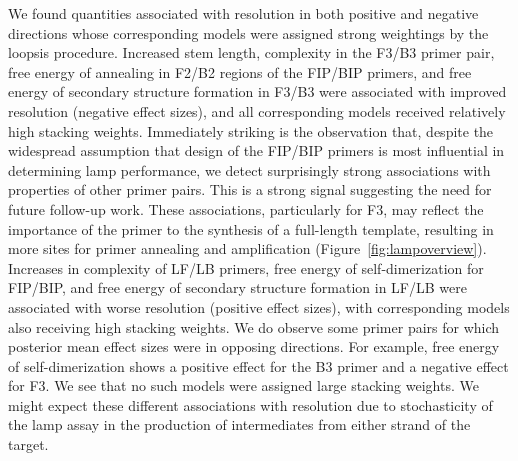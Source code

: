 \documentclass[../thesis.tex]{subfiles}
\begin{document}
We found quantities associated with resolution in both positive and negative directions whose corresponding models were assigned strong weightings by the \gls{loopsis} procedure. Increased stem length, complexity in the F3/B3 primer pair, free energy of annealing in F2/B2 regions of the FIP/BIP primers, and free energy of secondary structure formation in F3/B3 were associated with improved resolution (negative effect sizes), and all corresponding models received relatively high stacking weights.
Immediately striking is the observation that, despite the widespread assumption that design of the FIP/BIP primers is most influential in determining \gls{lamp} performance, we detect surprisingly strong associations with properties of other primer pairs. This is a strong signal suggesting the need for future follow-up work.
These associations, particularly for F3, may reflect the importance of the primer to the synthesis of a full-length template, resulting in more sites for primer annealing and amplification (Figure~\ref{fig:lampoverview}). Increases in complexity of LF/LB primers, free energy of self-dimerization for FIP/BIP, and free energy of secondary structure formation in LF/LB were associated with worse resolution (positive effect sizes), with corresponding models also receiving high stacking weights. We do observe some primer pairs for which posterior mean effect sizes were in opposing directions. For example, free energy of self-dimerization shows a positive effect for the B3 primer and a negative effect for F3. We see that no such models were assigned large stacking weights. We might expect these different associations with resolution due to stochasticity of the \gls{lamp} assay in the production of intermediates from either strand of the target.
\end{document}
